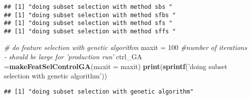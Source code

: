 \documentclass[]{article}
\newenvironment{Shaded}{\begin{snugshade}}{\end{snugshade}}
\newcommand{\CommentTok}[1]{\textcolor[rgb]{0.56,0.35,0.01}{\textit{#1}}}
\newcommand{\DataTypeTok}[1]{\textcolor[rgb]{0.13,0.29,0.53}{#1}}
\newcommand{\DecValTok}[1]{\textcolor[rgb]{0.00,0.00,0.81}{#1}}
\newcommand{\KeywordTok}[1]{\textcolor[rgb]{0.13,0.29,0.53}{\textbf{#1}}}
\newcommand{\NormalTok}[1]{#1}
\newcommand{\OperatorTok}[1]{\textcolor[rgb]{0.81,0.36,0.00}{\textbf{#1}}}
\newcommand{\OtherTok}[1]{\textcolor[rgb]{0.56,0.35,0.01}{#1}}
\newcommand{\StringTok}[1]{\textcolor[rgb]{0.31,0.60,0.02}{#1}}
\begin{document}
\begin{verbatim}
## [1] "doing subset selection with method sbs "
## [1] "doing subset selection with method sfbs "
## [1] "doing subset selection with method sfs "
## [1] "doing subset selection with method sffs "
\end{verbatim}

\begin{Shaded}
\begin{Highlighting}[]
\CommentTok{# do feature selection with genetic algorithm}
\NormalTok{maxit =}\StringTok{ }\DecValTok{100} \CommentTok{#number of iterations - should be large for 'production run'}
\NormalTok{ctrl_GA =}\KeywordTok{makeFeatSelControlGA}\NormalTok{(}\DataTypeTok{maxit =}\NormalTok{ maxit)}
\KeywordTok{print}\NormalTok{(}\KeywordTok{sprintf}\NormalTok{(}\StringTok{'doing subset selection with genetic algorithm'}\NormalTok{))}
\end{Highlighting}
\end{Shaded}

\begin{verbatim}
## [1] "doing subset selection with genetic algorithm"
\end{verbatim}

\begin{Shaded}
\end{Shaded}
\end{document}
